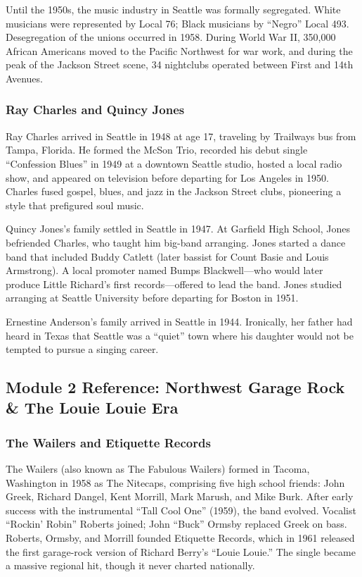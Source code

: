 \documentclass[11pt,letterpaper]{article}
\begin{document}
Until the 1950s, the music industry in Seattle was formally segregated. White musicians were represented by Local 76; Black musicians by ``Negro'' Local 493. Desegregation of the unions occurred in 1958. During World War II, 350,000 African Americans moved to the Pacific Northwest for war work, and during the peak of the Jackson Street scene, 34 nightclubs operated between First and 14th Avenues.

\subsubsection{Ray Charles and Quincy Jones}

Ray Charles arrived in Seattle in 1948 at age 17, traveling by Trailways bus from Tampa, Florida. He formed the McSon Trio, recorded his debut single ``Confession Blues'' in 1949 at a downtown Seattle studio, hosted a local radio show, and appeared on television before departing for Los Angeles in 1950. Charles fused gospel, blues, and jazz in the Jackson Street clubs, pioneering a style that prefigured soul music.

Quincy Jones's family settled in Seattle in 1947. At Garfield High School, Jones befriended Charles, who taught him big-band arranging. Jones started a dance band that included Buddy Catlett (later bassist for Count Basie and Louis Armstrong). A local promoter named Bumps Blackwell---who would later produce Little Richard's first records---offered to lead the band. Jones studied arranging at Seattle University before departing for Boston in 1951.

Ernestine Anderson's family arrived in Seattle in 1944. Ironically, her father had heard in Texas that Seattle was a ``quiet'' town where his daughter would not be tempted to pursue a singing career.

\subsection{Module 2 Reference: Northwest Garage Rock \& The Louie Louie Era}

\subsubsection{The Wailers and Etiquette Records}

The Wailers (also known as The Fabulous Wailers) formed in Tacoma, Washington in 1958 as The Nitecaps, comprising five high school friends: John Greek, Richard Dangel, Kent Morrill, Mark Marush, and Mike Burk. After early success with the instrumental ``Tall Cool One'' (1959), the band evolved. Vocalist ``Rockin' Robin'' Roberts joined; John ``Buck'' Ormsby replaced Greek on bass. Roberts, Ormsby, and Morrill founded Etiquette Records, which in 1961 released the first garage-rock version of Richard Berry's ``Louie Louie.'' The single became a massive regional hit, though it never charted nationally.
\end{document}
